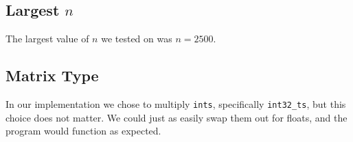 \documentclass[solution, letterpaper]{cs121}
\begin{document}
\subsection*{Largest $n$}
The largest value of $n$ we tested on was $n = 2500$. 

\subsection*{Matrix Type}
In our implementation we chose to multiply {\tt ints}, specifically {\tt int32\_ts}, but this choice does not matter. We could just as easily swap them out for floats, and the program would function as expected.
\end{document}
